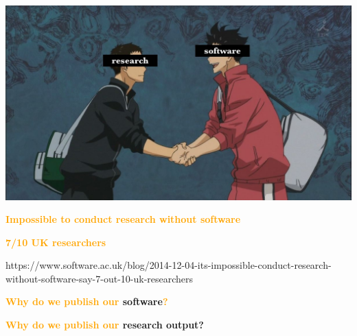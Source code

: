 \documentclass{beamer}
\begin{document}
\begin{frame}
    \begin{center}
    \includegraphics[width=\textwidth]{static/research_and_software.jpg}\hspace{8pt}
    \end{center}
\end{frame}

\begin{frame}
    \centering
    \Large{\textbf{\textcolor{orange}{Impossible to conduct research without software}}} \\
    \vspace{.3cm}

    \LARGE{\textbf{\textcolor{orange}{7/10 UK researchers}}}
    \vspace{2cm}

    \tiny{https://www.software.ac.uk/blog/2014-12-04-its-impossible-conduct-research-without-software-say-7-out-10-uk-researchers}
\end{frame}

\begin{frame}
    \centering
    \Large{\textbf{\textcolor{orange}{Why do we publish our} software\textcolor{orange}{?}}}
\end{frame}


\begin{frame}
    \centering
    \Large{\textbf{\textcolor{orange}{Why do we publish our} research output?}}
\end{frame}

\end{document}
